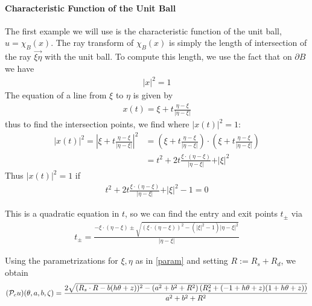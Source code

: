\documentclass[12pt]{article}
\begin{document}
\paragraph{Characteristic Function of the Unit Ball}
The first example we will use is the characteristic function of the unit ball, $u = \chi_{B}(x)$.  The ray transform of $\chi_B(x)$ is simply the length of intersection of the ray $\overrightarrow{\xi\eta}$ with the unit ball.  To compute this length, we use the fact that on $\partial B$ we have
\begin{align*}
\vert x\vert ^2 = 1
\end{align*}  The equation of a line from $\xi$ to $\eta$ is given by 
\begin{align*}
x(t) = \xi+t\frac{\eta-\xi}{\vert \eta-\xi\vert}
\end{align*}thus to find the intersection points, we find where $\vert x(t)\vert^2 = 1$: 
\begin{align*}
\vert x(t)\vert ^2 = \left\vert \xi+t\frac{\eta-\xi}{\vert \eta-\xi\vert}\right\vert ^2  &= \left(\xi+t\frac{\eta-\xi}{\vert \eta-\xi\vert}\right)\cdot \left(\xi+t\frac{\eta-\xi}{\vert \eta-\xi\vert}\right)\\
& = t^2 + 2t\frac{\xi\cdot(\eta-\xi)}{\vert \eta -\xi\vert} + \vert \xi\vert^2
\end{align*}Thus $\vert x(t)\vert^2 = 1$ if 
\begin{align*}
t^2 + 2t\frac{\xi\cdot(\eta-\xi)}{\vert \eta -\xi\vert} + \vert \xi\vert^2-1=0
\end{align*}

This is a quadratic equation in $t$, so we can find the entry and exit points $t_{\pm}$ via 
\begin{align*}
t_{\pm} = \frac{-\xi\cdot(\eta-\xi)\pm\sqrt{(\xi\cdot (\eta-\xi))^2-(\vert\xi\vert^2-1)\vert\eta-\xi\vert^2}}{\vert\eta-\xi\vert}
\end{align*}

Using the parametrizations for $\xi,\eta$ as in \eqref{param} and setting $R:=R_s+R_d$, we obtain 
\begin{align*}
(\P_cu)(\theta,a,b,\zeta) = \frac{2 \sqrt{(R_s \cdot R-b (h \theta+z))^2-\left(a^2+b^2+R^2\right) \left(R_s^2+(-1+h \theta+z) (1+h \theta+z)\right)}}{a^2+b^2+R^2}
\end{align*}
\end{document}
